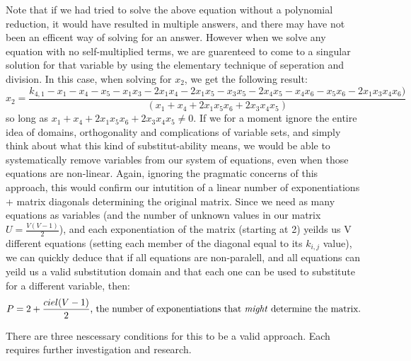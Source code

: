 \documentclass[a4paper,12pt]{article}
\begin{document}
Note that if we had tried to solve the above equation without a polynomial reduction, it would have resulted in multiple answers, and there may have not been an efficent way of solving for an answer. However when we solve any equation with no self-multiplied terms, we are guarenteed to come to a singular solution for that variable by using the elementary technique of seperation and division. In this case, when solving for \(x_2\), we get the following result:
\[x_2 = \frac{{k}_{4, 1} - x_{1} - x_{4} - x_{5} - x_{1}x_{3} - 2x_{1}x_{4} - 2x_{1}x_{5} - x_{3}x_{5} - 2x_{4}x_{5} - x_{4}x_{6} - x_{5}x_{6} - 2x_{1}x_{3}x_{4}x_{6})}
{(x_{1} + x_{4} + 2x_{1}x_{5}x_{6} + 2x_{3}x_{4}x_{5})}\]
so long as \(x_{1} + x_{4} + 2x_{1}x_{5}x_{6} + 2x_{3}x_{4}x_{5} \neq 0\).  If we for a moment ignore the entire idea of domains, orthogonality and complications of variable sets, and simply think about what this kind of substitut-ability means, we would be able to systematically remove variables from our system of equations, even when those equations are non-linear. Again, ignoring the pragmatic concerns of this approach, this would confirm our intutition of a linear number of exponentiations + matrix diagonals determining the original matrix. Since we need as many equations as variables (and the number of unknown values in our matrix \(U = \frac{V (V-1)}{2}\)), and each exponentiation of the matrix (starting at 2) yeilds us V different equations (setting each member of the diagonal equal to its \(k_{i,j}\) value), we can quickly deduce that if all equations are non-paralell, and all equations can yeild us a valid substitution domain and that each one can be used to substitute for a different variable, then:
\[  P = 2 + \frac{ciel(V-1)}{2} \text{, the number of exponentiations that \emph{might} determine the matrix.}\]

There are three nescessary conditions for this to be a valid approach. Each requires further investigation and research.
\end{document}
